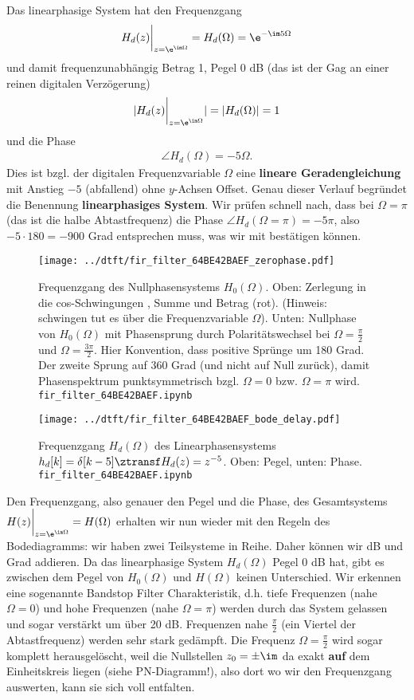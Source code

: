 Das linearphasige System hat den Frequenzgang
\begin{align}
H_d(z)\bigg|_{z=\e^{\im\Omega}} = H_d(\Omega) = \e^{-\im 5 \Omega}
\end{align}
und damit frequenzunabhängig Betrag 1, Pegel 0 dB
(das ist der Gag an einer reinen digitalen Verzögerung)
\begin{align}
|H_d(z)\bigg|_{z=\e^{\im\Omega}}| = |H_d(\Omega)| = 1
\end{align}
und die Phase
\begin{align}
\angle H_d(\Omega) = -5 \Omega.
\end{align}
Dies ist bzgl. der digitalen Frequenzvariable $\Omega$ eine \textbf{lineare
Geradengleichung} mit Anstieg $-5$ (abfallend) ohne $y$-Achsen Offset.
Genau dieser Verlauf begründet die Benennung \textbf{linearphasiges System}.
Wir prüfen schnell nach, dass bei $\Omega=\pi$ (das ist die halbe Abtastfrequenz)
die Phase $\angle H_d(\Omega=\pi) = - 5\pi$, also $-5 \cdot 180=-900$ Grad entsprechen muss,
was wir mit  bestätigen können.
%
\begin{figure}
\centering
\texttt{[image: ../dtft/fir\_filter\_64BE42BAEF\_zerophase.pdf]}
\caption{Frequenzgang des Nullphasensystems $H_0(\Omega)$.
Oben: Zerlegung in die cos-Schwingungen , Summe und Betrag (rot).
(Hinweis: schwingen tut es über die Frequenzvariable $\Omega$).
Unten: Nullphase von $H_0(\Omega)$ mit
Phasensprung durch Polaritätswechsel bei $\Omega=\frac{\pi}{2}$ und $\Omega=\frac{3\pi}{2}$.
Hier Konvention, dass positive Sprünge um 180 Grad. Der zweite Sprung auf 360 Grad
(und nicht auf Null zurück), damit Phasenspektrum punktsymmetrisch bzgl.
$\Omega=0$ bzw. $\Omega=\pi$ wird. \texttt{fir\_filter\_64BE42BAEF.ipynb}
}
\label{fig:fir_filter_64BE42BAEF_zerophase}
\end{figure}
%
\begin{figure}
\centering
\texttt{[image: ../dtft/fir\_filter\_64BE42BAEF\_bode\_delay.pdf]}
\caption{Frequenzgang $H_d(\Omega)$ des Linearphasensystems
$h_d[k]=\delta[k-5] \ztransf H_d(z)=z^{-5}$. Oben: Pegel, unten: Phase.
\texttt{fir\_filter\_64BE42BAEF.ipynb}}
\label{fig:fir_filter_64BE42BAEF_bode_delay}
\end{figure}
%

Den Frequenzgang, also genauer den Pegel und die Phase, des
Gesamtsystems $H(z)\bigg|_{z=\e^{\im\Omega}} = H(\Omega)$
erhalten wir nun wieder mit den Regeln des Bodediagramms:
wir haben zwei Teilsysteme in Reihe. Daher können wir dB und Grad addieren.
Da das linearphasige System $H_d(\Omega)$ Pegel 0 dB hat, gibt es zwischen
dem Pegel von $H_0(\Omega)$ und $H(\Omega)$ keinen Unterschied.
Wir erkennen eine sogenannte Bandstop Filter Charakteristik, d.h. tiefe Frequenzen
(nahe $\Omega=0$) und hohe Frequenzen (nahe $\Omega=\pi$) werden durch das System
gelassen und sogar verstärkt um über 20 dB. Frequenzen nahe $\frac{\pi}{2}$ (ein Viertel
der Abtastfrequenz) werden sehr stark gedämpft. Die Frequenz $\Omega=\frac{\pi}{2}$
wird sogar komplett herausgelöscht, weil die Nullstellen $z_0 = \pm \im$ da exakt \textbf{auf}
dem Einheitskreis liegen (siehe PN-Diagramm!),
also dort wo wir den Frequenzgang auswerten, kann sie sich voll entfalten.

